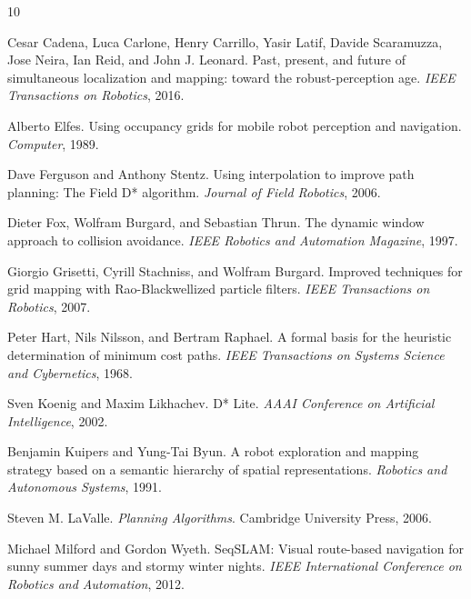 \documentclass{article}
\begin{document}

\begin{thebibliography}{10}

Cesar Cadena, Luca Carlone, Henry Carrillo, Yasir Latif, Davide Scaramuzza,
Jose Neira, Ian Reid, and John J. Leonard.
\newblock Past, present, and future of simultaneous localization and mapping:
toward the robust-perception age.
\newblock \emph{IEEE Transactions on Robotics}, 2016.

Alberto Elfes.
\newblock Using occupancy grids for mobile robot perception and navigation.
\newblock \emph{Computer}, 1989.

Dave Ferguson and Anthony Stentz.
\newblock Using interpolation to improve path planning: The Field D* algorithm.
\newblock \emph{Journal of Field Robotics}, 2006.

Dieter Fox, Wolfram Burgard, and Sebastian Thrun.
\newblock The dynamic window approach to collision avoidance.
\newblock \emph{IEEE Robotics and Automation Magazine}, 1997.

Giorgio Grisetti, Cyrill Stachniss, and Wolfram Burgard.
\newblock Improved techniques for grid mapping with Rao-Blackwellized particle
filters.
\newblock \emph{IEEE Transactions on Robotics}, 2007.

Peter Hart, Nils Nilsson, and Bertram Raphael.
\newblock A formal basis for the heuristic determination of minimum cost paths.
\newblock \emph{IEEE Transactions on Systems Science and Cybernetics}, 1968.

Sven Koenig and Maxim Likhachev.
\newblock D* Lite.
\newblock \emph{AAAI Conference on Artificial Intelligence}, 2002.

Benjamin Kuipers and Yung-Tai Byun.
\newblock A robot exploration and mapping strategy based on a semantic hierarchy
of spatial representations.
\newblock \emph{Robotics and Autonomous Systems}, 1991.

Steven M. LaValle.
\newblock \emph{Planning Algorithms}.
\newblock Cambridge University Press, 2006.

Michael Milford and Gordon Wyeth.
\newblock SeqSLAM: Visual route-based navigation for sunny summer days and stormy
winter nights.
\newblock \emph{IEEE International Conference on Robotics and Automation}, 2012.


\end{thebibliography}
\end{document}
